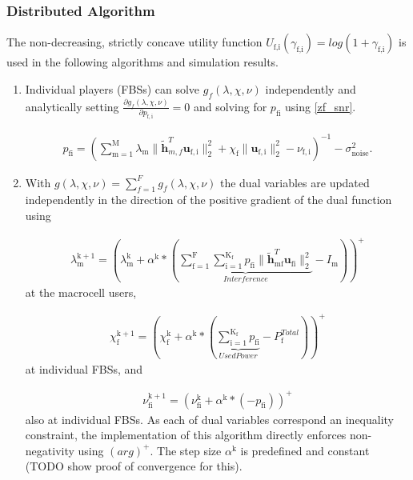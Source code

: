 \documentclass[12pt,a4paper]{report}
\begin{document}
\subsubsection{Distributed Algorithm}\label{algo1}
The non-decreasing, strictly concave utility function $U_{\text{f,i}}(\gamma_{\text{f,i}}) = log(1+\gamma_{\text{f,i}})$ 
is used in the following algorithms and simulation results.

\begin{enumerate}
\item 
Individual players (FBSs) can solve $ g_f(\lambda, \chi, \nu) $ independently and analytically setting $\frac{\partial g_f(\lambda, \chi, \nu)}{\partial p_{\mathrm{f,i}}} = 0$ 
and solving for $p_{\mathrm{fi}}$ using \eqref{zf_snr}.

\begin{gather}
p_{\mathrm{fi}} = (\sum_{\mathrm{m=1}}^{\mathrm{M}}\lambda_{\mathrm{m}}\|\mathbf{\tilde{h}}_{m,f}^T \mathbf{u}_{\mathrm{f,i}}\|^2_2
+\chi_{\text{f}} \|\mathbf{u}_{\mathrm{f,i}}\|^2_2
-\nu_{\mathrm{f,i}}
 )^{-1}
  - \sigma^2_{\text{noise}}.
\end{gather}

\item 
With $g(\lambda, \chi, \nu) = \sum_{f=1}^{F}g_f(\lambda, \chi, \nu)$ the dual variables are updated independently in the direction of the positive gradient of the dual function using

\begin{gather}
\lambda_{\mathrm{m}}^{\mathrm{k+1}} = (
\lambda_{\mathrm{m}}^{\mathrm{k}}
+
\alpha^{\mathrm{k}}*
(
\underbrace{
\sum _{\mathrm{f=1}}^{\mathrm{F}}
\sum _{\mathrm{i=1}}^{\mathrm{K_{\mathrm{f}}}}
p_{\mathrm{fi}}
\|\mathbf{\tilde{h}}_{\mathrm{mf}}^T \mathbf{u_{\mathrm{fi}}}\|^2_2}_{Interference}
- I_{\mathrm{m}}
))^+
\end{gather}
 at the macrocell users,

\begin{gather}
\chi_{\mathrm{f}}^{\mathrm{k+1}} = (
\chi_{\mathrm{f}}^{\mathrm{k}}
+
\alpha^{\mathrm{k}}*
(\underbrace{\sum_{\mathrm{i=1}}^{\mathrm{K_{\mathrm{f}}}} p_{\mathrm{fi}}}_{Used Power} - P_{\mathrm{f}}^{Total}) )^+
\end{gather}
 at individual FBSs, and 

\begin{gather}
\nu_{\mathrm{fi}}^{\mathrm{k+1}} = (
\nu_{\mathrm{fi}}^{\mathrm{k}}
+
\alpha^{\mathrm{k}}*
(-p_{\mathrm{fi}}))^+
\end{gather}
also at individual FBSs.
As each of dual variables correspond an inequality constraint, the implementation of this algorithm directly enforces non-negativity using 
$(arg)^+$.
The step size $\alpha^{\mathrm{k}}$ is predefined and constant (TODO show proof of convergence for this).



\end{enumerate} 
\end{document}
